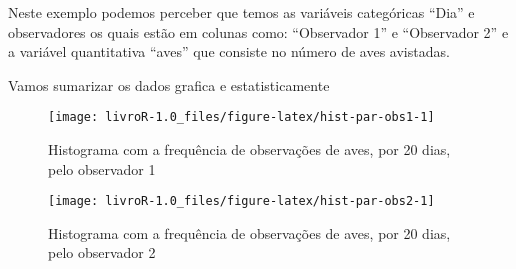 \documentclass[14pt,titlepage, oneside, openany, a4paper]{book}
\newenvironment{Shaded}{\begin{snugshade}}{\end{snugshade}}
\newcommand{\DataTypeTok}[1]{\textcolor[rgb]{0.13,0.29,0.53}{#1}}
\newcommand{\DecValTok}[1]{\textcolor[rgb]{0.00,0.00,0.81}{#1}}
\newcommand{\KeywordTok}[1]{\textcolor[rgb]{0.13,0.29,0.53}{\textbf{#1}}}
\newcommand{\NormalTok}[1]{#1}
\newcommand{\OperatorTok}[1]{\textcolor[rgb]{0.81,0.36,0.00}{\textbf{#1}}}
\newcommand{\StringTok}[1]{\textcolor[rgb]{0.31,0.60,0.02}{#1}}
\begin{document}
Neste exemplo podemos perceber que temos as variáveis categóricas ``Dia'' e observadores os quais estão em colunas como: ``Observador 1'' e ``Observador 2'' e a variável quantitativa ``aves'' que consiste no número de aves avistadas.

Vamos sumarizar os dados grafica e estatisticamente

\begin{Shaded}
\end{Shaded}

\begin{figure}[H]
\texttt{[image: livroR-1.0\_files/figure-latex/hist-par-obs1-1]} \caption{Histograma com a frequência de observações de aves, por 20 dias, pelo observador 1}\label{fig:hist-par-obs1}
\end{figure}

\begin{Shaded}
\end{Shaded}

\begin{figure}[H]
\texttt{[image: livroR-1.0\_files/figure-latex/hist-par-obs2-1]} \caption{Histograma com a frequência de observações de aves, por 20 dias, pelo observador 2}\label{fig:hist-par-obs2}
\end{figure}

\begin{Shaded}
\end{Shaded}
\end{document}
